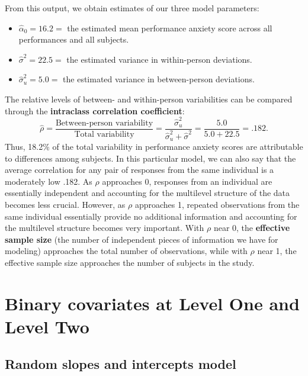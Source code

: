 \documentclass[
]{krantz}
\providecommand{\tightlist}{%
  \setlength{\itemsep}{0pt}\setlength{\parskip}{0pt}}
\begin{document}
From this output, we obtain estimates of our three model parameters:

\begin{itemize}
\tightlist
\item
  \(\hat{\alpha}_{0}=16.2=\) the estimated mean performance anxiety score across all performances and all subjects.
\item
  \(\hat{\sigma}^2=22.5=\) the estimated variance in within-person deviations.
\item
  \(\hat{\sigma}_{u}^{2}=5.0=\) the estimated variance in between-person deviations.
\end{itemize}

The relative levels of between- and within-person variabilities can be compared through the \textbf{intraclass correlation coefficient}:
\begin{equation}
\hat{\rho}=\frac{\textrm{Between-person variability}}{\textrm{Total variability}} = \frac{\hat{\sigma}_{u}^{2}}{\hat{\sigma}_{u}^{2}+\hat{\sigma}^2} = \frac{5.0}{5.0+22.5} = .182.
\label{eq:intracc}
\end{equation}
Thus, 18.2\% of the total variability in performance anxiety scores are attributable to differences among subjects. In this particular model, we can also say that the average correlation for any pair of responses from the same individual is a moderately low .182. As \(\rho\) approaches 0, responses from an individual are essentially independent and accounting for the multilevel structure of the data becomes less crucial. However, as \(\rho\) approaches 1, repeated observations from the same individual essentially provide no additional information and accounting for the multilevel structure becomes very important. With \(\rho\) near 0, the \textbf{effective sample size} (the number of independent pieces of information we have for modeling) approaches the total number of observations, while with \(\rho\) near 1, the effective sample size approaches the number of subjects in the study.

\hypertarget{modelb}{%
\section{Binary covariates at Level One and Level Two}\label{modelb}}

\hypertarget{randomslopeandint}{%
\subsection{Random slopes and intercepts model}\label{randomslopeandint}}
\end{document}
